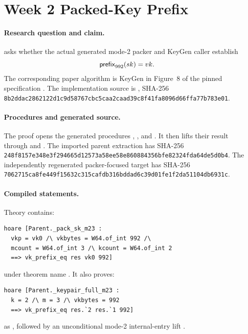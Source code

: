 \section{Week 2 Packed-Key Prefix}
\label{sec:week2-pack}

\paragraph{Research question and claim.}
 asks whether the actual generated mode-2 packer and
KeyGen caller establish
\[
  \mathsf{prefix}_{992}(sk)=vk.
\]
The corresponding paper algorithm is KeyGen in Figure~8 of the pinned
specification \cite{haetae-pdf}. The implementation source is
, SHA-256
\texttt{8b2ddac2862122d1c9d58767cbc5caa2caad39c8f41fa8096d66ffa77b783e01}.

\paragraph{Procedures and generated source.}
The proof opens the generated procedures
, , and
. It then lifts their result through
 and
.
The imported parent extraction has SHA-256
\texttt{248f8157e348e3f294665d12573a58ee58e860884356bfe82324fda64de5d0b4}.
The independently regenerated packer-focused target has SHA-256
\texttt{7062715ca8fe449f15632c315cafdb316bddad6c39d01fe1f2da51104db6931c}.

\paragraph{Compiled statements.}
Theory  contains:
\begin{verbatim}
hoare [Parent._pack_sk_m23 :
  vkp = vk0 /\ vkbytes = W64.of_int 992 /\
  mcount = W64.of_int 3 /\ kcount = W64.of_int 2
  ==> vk_prefix_eq res vk0 992]
\end{verbatim}
under theorem name
. It also proves:
\begin{verbatim}
hoare [Parent._keypair_full_m23 :
  k = 2 /\ m = 3 /\ vkbytes = 992
  ==> vk_prefix_eq res.`2 res.`1 992]
\end{verbatim}
as , followed by an
unconditional mode-2 internal-entry lift
.


